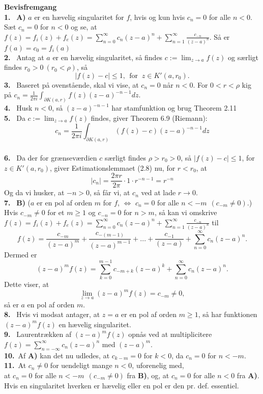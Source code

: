 \documentclass[10pt,a4paper]{article}
\theoremstyle{definition}
\begin{document}
\begin{framed}
\textbf{Bevisfremgang} \\
\textbf{1.} \ \textbf{A)} $a$ er en hævelig singularitet for $f$, hvis og kun hvis $c_n=0$ for alle $n<0$. Sæt $c_n=0$ for $n<0$ og se, at $f(z)=f_i(z)+f_e(z)= \sum\limits_{n=0}^\infty c_n (z-a)^n + \sum\limits_{n=1}^\infty \frac{c_{-n}}{(z-a)^n}$. Så er $f(a) = c_0 =f_i(a)$ \\
\textbf{2.} \ Antag at $a$ er en hævelig singularitet, så findes $c := \lim_{z \rightarrow a} f(z)$ og særligt findes $r_0 > 0 \ (r_0 < \rho)$, så 
$$|f(z) -c| \leq 1, \ \ \text{for } \ z \in K'(a,r_0).$$
\textbf{3.} \ Baseret på ovenstående, skal vi vise, at $c_n = 0$ når $n<0$. For $0<r<\rho$ kig på $c_n = \frac{1}{2\pi i} \int_{\partial K(a,r)} f(z) (z-a)^{-n-1}dz$. \\
\textbf{4.} \ Husk $n<0$, så $(z-a)^{-n-1}$ har stamfunktion og brug Theorem 2.11\\
\textbf{5.} \ Da $c := \lim_{z \rightarrow a} f(z)$ findes, giver Theorem 6.9 (Riemann):
$$c_n = \frac{1}{2 \pi i} \int_{\partial K(a,r)} (f(z)-c)(z-a)^{-n-1}dz$$ \\
\textbf{6.} \ Da der for grænseværdien $c$ særligt findes $\rho>r_0>0$, så $|f(z)-c| \leq 1$, for $z \in K'(a,r_0)$, giver Estimationslemmaet (2.8) nu, for $r<r_0$, at
$$|c_n| = \frac{2\pi r}{2 \pi} \cdot 1 \cdot r^{-n-1} = r^{-n}$$
Og da vi husker, at $-n>0$, så får vi, at $c_n$ ved at lade $r \rightarrow 0$. \\
\textbf{7.} \  \textbf{B)} ($a$ er en pol af orden $m$ for $f$, $\Leftrightarrow$ $c_n=0$ for alle $n < -m \ \ (c_{-m} \neq 0)$.)
Hvis $c_{-m}\neq 0$ for et $m\geq1$ og $c_{-n}=0$ for $n>m$, så kan vi omskrive $f(z)=f_i(z)+f_e(z)= \sum\limits_{n=0}^\infty c_n (z-a)^n + \sum\limits_{n=1}^\infty \frac{c_{-n}}{(z-a)^n}$ til 
$$f(z) = \frac{c_{-m}}{(z-a)^m} + \frac{c_{-(m-1)}}{(z-a)^{m-1}} + ... + \frac{c_{-1}}{(z-a)} + \sum\limits_{n=0}^\infty c_n (z-a)^n.$$
Dermed er
$$(z-a)^m f(z) = \sum\limits_{k=0}^{m-1} c_{-m+k}(z-a)^k + \sum\limits_{n=0}^\infty c_n(z-a)^n.$$
Dette viser, at 
$$\lim_{z \rightarrow a} (z-a)^m f(z) = c_{-m} \neq 0,$$
så er $a$ en pol af orden $m$.  \\
\textbf{8.} \ Hvis vi modsat antager, at $z=a$ er en pol af orden $m \geq 1$, så har funktionen $(z-a)^m f(z)$ en hævelig singularitet. \\
\textbf{9.} \ Laurentrækken af $(z-a)^m f(z)$ opnås ved at multiplicitere $f(z) = \sum\limits_{n=-\infty}^\infty c_n(z-a)^n$ med $(z-a)^m$. \\
\textbf{10.}\ Af \textbf{A)} kan det nu udledes, at $c_{k-m} = 0$ for $k<0$, da $c_n = 0$ for $n<-m$. \\
\textbf{11.}\ At $c_n \neq 0$ for uendeligt mange $n<0$, uforenelig med, \\
at $c_n=0$ for alle $n < -m \ \ (c_{-m} \neq 0)$ fra \textbf{B)}, og, at $c_n=0$ for alle $n<0$ fra \textbf{A)}. Hvis en singularitet hverken er hævelig eller en pol er den pr. def. essentiel. \\
\end{framed}
\end{document}
